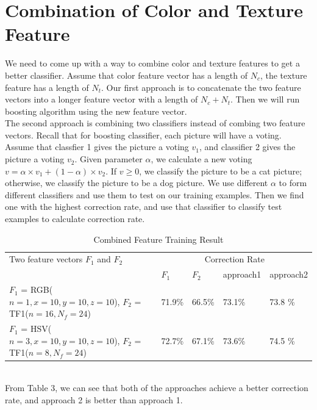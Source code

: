 \documentclass[12pt]{article}
\begin{document}
\section {Combination of Color and Texture Feature}
We need to come up with a way to combine color and texture features to get a better classifier. Assume that color feature vector has a length of $N_c$, the texture feature has a length of $N_t$. Our first approach is to concatenate the two feature vectors into a longer feature vector with a length of $N_c + N_t$. Then we will run boosting algorithm using the new feature vector. \\
The second approach is combining two classifiers instead of combing two feature vectors. Recall that for boosting classifier, each picture will have a voting. Assume that classfier 1 gives the picture a voting $v_1$, and classifier 2 gives the picture a voting $v_2$. Given parameter $\alpha$, we calculate a new voting $ v = \alpha \times v_1 + (1-\alpha) \times v_2$. If $v \geq 0$, we classify the picture to be a cat picture; otherwise, we classify the picture to be a dog picture. We use different $\alpha$ to form different classifiers and use them to test on our training examples. Then we find one with the highest correction rate, and use that classifier to classify test examples to calculate correction rate. \\
\begin{table}[h]
\caption{Combined Feature Training Result}
\centering
\begin{tabular}{| p{8cm}| l | l | l | l |}
\hline
Two feature vectors $F_1$ and $F_2$ & \multicolumn{4}{|c|}{Correction Rate} \\ \cline{2-5}
 & $F_1$ & $F_2$ & approach1 & approach2 \\
\hline
$F_1$ = RGB($n=1,x=10,y=10,z=10$), $F_2$ = TF1($n=16,N_f=24$) & 71.9\% & 66.5\% & 73.1\% & 73.8 \% \\
\hline
$F_1$ = HSV($n=3,x=10,y=10,z=10$), $F_2$ = TF1($n=8,N_f=24$) & 72.7\% & 67.1\% & 73.6\% & 74.5 \% \\
\hline
\end{tabular}
\end{table}\\
From Table 3, we can see that both of the approaches achieve a better correction rate, and approach 2 is better than approach 1.
\end{document}
